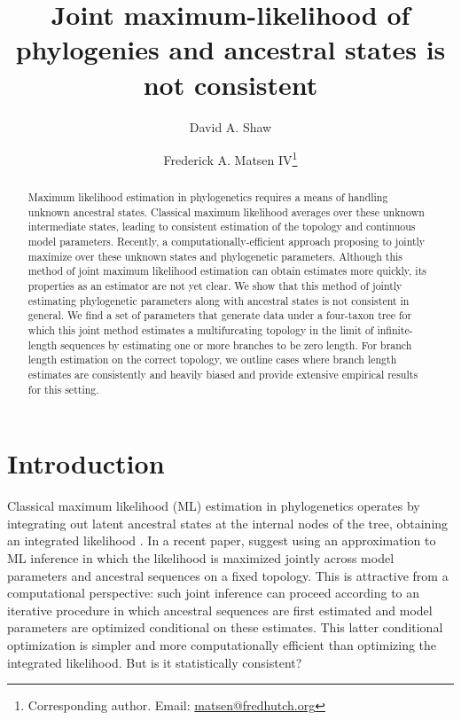 \documentclass[11pt]{article}
\title{Joint maximum-likelihood of phylogenies and ancestral states is not consistent}
\author[1]{David A. Shaw}
\author[1]{Frederick A. Matsen IV\thanks{Corresponding author. Email: \url{matsen@fredhutch.org}}}
\affil[1]{Computational Biology Program, Fred Hutchinson Cancer Research Center\\ Seattle, WA, USA}
\date{}
\begin{document}
\renewcommand{\arraystretch}{1.2} %

\maketitle

\begin{abstract}
Maximum likelihood estimation in phylogenetics requires a means of handling unknown ancestral states.
Classical maximum likelihood averages over these unknown intermediate states, leading to consistent estimation of the topology and continuous model parameters.
Recently, a computationally-efficient approach proposing to jointly maximize over these unknown states and phylogenetic parameters.
Although this method of joint maximum likelihood estimation can obtain estimates more quickly, its properties as an estimator are not yet clear.
We show that this method of jointly estimating phylogenetic parameters along with ancestral states is not consistent in general.
We find a set of parameters that generate data under a four-taxon tree for which this joint method estimates a multifurcating topology in the limit of infinite-length sequences by estimating one or more branches to be zero length.
For branch length estimation on the correct topology, we outline cases where branch length estimates are consistently and heavily biased and provide extensive empirical results for this setting.
\end{abstract}

\newpage

\section*{Introduction}

Classical maximum likelihood (ML) estimation in phylogenetics operates by integrating out latent ancestral states at the internal nodes of the tree, obtaining an integrated likelihood \citep{Goldman1990-dk}.
In a recent paper, \citet{Sagulenko2018-xl} suggest using an approximation to ML inference in which the likelihood is maximized jointly across model parameters and ancestral sequences on a fixed topology.
This is attractive from a computational perspective: such joint inference can proceed according to an iterative procedure in which ancestral sequences are first estimated and model parameters are optimized conditional on these estimates.
This latter conditional optimization is simpler and more computationally efficient than optimizing the integrated likelihood.
But is it statistically consistent?
\end{document}
